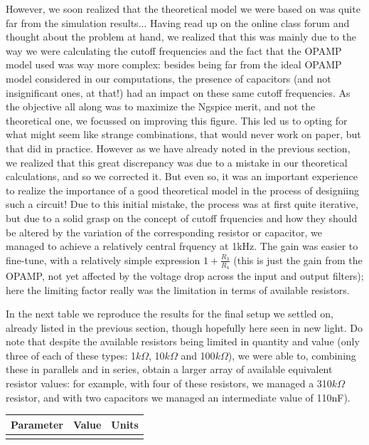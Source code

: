 However, we soon realized that the theoretical model we were based on was quite far from the simulation results... Having read up on the online class forum and thought about the problem at hand, we realized that this was mainly due to the way we were calculating the cutoff frequencies and the fact that the OPAMP model used was way more complex: besides being far from the ideal OPAMP model considered in our computations, the presence of capacitors (and not insignificant ones, at that!) had an impact on these same cutoff frequencies. As the objective all along was to maximize the Ngspice merit, and not the theoretical one, we focussed on improving this figure. This led us to opting for what might seem like strange combinations, that would never work on paper, but that did in practice. However as we have already noted in the previous section, we realized that this great discrepancy was due to a mistake in our theoretical calculations, and so we corrected it. But even so, it was an important experience to realize the importance of a good theoretical model in the process of designiing such a circuit! Due to this initial mistake, the process was at first quite iterative, but due to a solid grasp on the concept of cutoff frquencies and how they should be altered by the variation of the corresponding resistor or capacitor, we managed to achieve a relatively central frquency at 1kHz. The gain was easier to fine-tune, with a relatively simple expression $1+\frac{R_3}{R_4}$ (this is just the gain from the OPAMP, not yet affected by the voltage drop across the input and output filters); here the limiting factor really was the limitation in terms of available resistors.

In the next table we reproduce the results for the final setup we settled on, already listed in the previous section, though hopefully here seen in new light. Do note that despite the available resistors being limited in quantity and value (only three of each of these types: 1$k\Omega$, 10$k\Omega$ and 100$k\Omega$), we were able to, combining these in parallels and in series, obtain a larger array of available equivalent resistor values: for example, with four of these resistors, we managed a 310$k\Omega$ resistor, and with two capacitors we managed an intermediate value of 110nF).


\hfill
 \parbox{1\linewidth}{
  \centering
  \begin{tabular}{|l|l|r|}
    \hline    
    {\bf Parameter} & {\bf Value} & {\bf Units }\\ \hline
    
  \label{tab:params2}
  \end{tabular}
  }
\par

